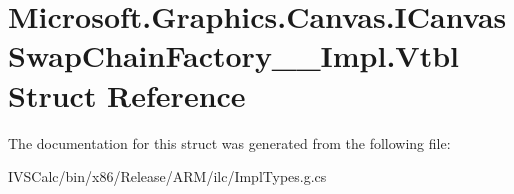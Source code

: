 \hypertarget{struct_microsoft_1_1_graphics_1_1_canvas_1_1_i_canvas_swap_chain_factory_____impl_1_1_vtbl}{}\section{Microsoft.\+Graphics.\+Canvas.\+I\+Canvas\+Swap\+Chain\+Factory\+\_\+\+\_\+\+Impl.\+Vtbl Struct Reference}
\label{struct_microsoft_1_1_graphics_1_1_canvas_1_1_i_canvas_swap_chain_factory_____impl_1_1_vtbl}


The documentation for this struct was generated from the following file\+:\begin{DoxyCompactItemize}
\item 
I\+V\+S\+Calc/bin/x86/\+Release/\+A\+R\+M/ilc/Impl\+Types.\+g.\+cs\end{DoxyCompactItemize}
